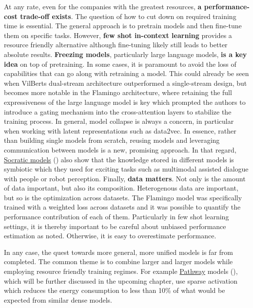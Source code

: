\documentclass[
]{krantz}
\begin{document}
At any rate, even for the companies with the greatest resources, \textbf{a performance-cost trade-off exists}. The question of how to cut down on required training time is essential. The general approach is to pretrain models and then fine-tune them on specific tasks. However, \textbf{few shot in-context learning} provides a resource friendly alternative although fine-tuning likely still leads to better absolute results. \textbf{Freezing models}, particularly large language models, \textbf{is a key idea} on top of pretraining. In some cases, it is paramount to avoid the loss of capabilities that can go along with retraining a model. This could already be seen when VilBerts dual-stream architecture outperformed a single-stream design, but becomes more notable in the Flamingo architecture, where retaining the full expressiveness of the large language model is key which prompted the authors to introduce a gating mechanism into the cross-attention layers to stabilize the training process. In general, model collapse is always a concern, in particular when working with latent representations such as data2vec. In essence, rather than building single models from scratch, reusing models and leveraging communication between models is a new, promising approach. In that regard, \href{https://socraticmodels.github.io/}{Socratic models} (\citet{zeng2022socratic}) also show that the knowledge stored in different models is symbiotic which they used for exciting tasks such as multimodal assisted dialogue with people or robot perception. Finally, \textbf{data matters}. Not only is the amount of data important, but also its composition. Heterogenous data are important, but so is the optimization across datasets. The Flamingo model was specifically trained with a weighted loss across datasets and it was possible to quantify the performance contribution of each of them. Particularly in few shot learning settings, it is thereby important to be careful about unbiased performance estimation as \citet{perez2021true} noted. Otherwise, it is easy to overestimate performance.

In any case, the quest towards more general, more unified models is far from completed.
The common theme is to combine larger and larger models while employing resource friendly training regimes. For example \href{https://blog.google/technology/ai/introducing-pathways-next-generation-ai-architecture/}{Pathway} models (\citet{chowdhery2022palm}), which will be further discussed in the upcoming chapter, use sparse activation which reduces the energy consumption to less than 10\% of what would be expected from similar dense models.
\end{document}
